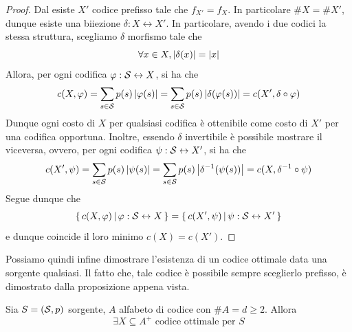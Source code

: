 \begin{proof}
  Dal  esiste \(X'\) codice prefisso tale che \(f_{X'} = f_X\).
  In particolare \(\# X = \# X'\), dunque esiste una biiezione \(\delta: X \leftrightarrow X'\).
  In particolare, avendo i due codici la stessa struttura, scegliamo \(\delta\) morfismo tale che
  \[\forall x \in X, \left|\delta(x)\right| = \left|x\right|\]
  Allora, per ogni codifica \(\varphi : \mathcal{S} \leftrightarrow X\), si ha che
  \[c(X,\varphi) = \sum_{s \in \mathcal{S}} p(s)\left|\varphi(s)\right| = \sum_{s \in \mathcal{S}} p(s)\left|\delta(\varphi(s))\right| = c(X', \delta \circ \varphi)\]
  Dunque ogni costo di \(X\) per qualsiasi codifica è ottenibile come costo di \(X'\) per una codifica opportuna.
  Inoltre, essendo \(\delta\) invertibile è possibile mostrare il viceversa, ovvero, per ogni codifica \(\psi: \mathcal{S} \leftrightarrow X'\), si ha che
  \[c(X',\psi) = \sum_{s \in \mathcal{S}} p(s)\left|\psi(s)\right| = \sum_{s \in \mathcal{S}} p(s)\left|\delta^{-1}(\psi(s))\right| = c(X, \delta^{-1} \circ \psi)\]
  Segue dunque che
  \[\set{c(X,\varphi)}[\varphi:\SCal \leftrightarrow X] = \set{c(X',\psi)}[\psi:\SCal \leftrightarrow X']\]
  e dunque coincide il loro minimo \(c(X) = c(X')\).
\end{proof}

Possiamo quindi infine dimostrare l'esistenza di un codice ottimale data una sorgente qualsiasi. Il fatto che, tale codice è possibile sempre sceglierlo prefisso, è dimostrato dalla proposizione appena vista.

\begin{proposition}[label=prop:optimal_prefix_code]{}
  Sia \(S = (\mathcal{S}, p)\) sorgente, \(A\) alfabeto di codice con \(\# A = d \geq 2\). Allora
  \[\exists X \subseteq A^+ \text{ codice ottimale per } S\]
\end{proposition}

